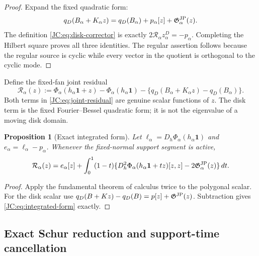 \documentclass[11pt]{amsart}
\providecommand{\mathscr}{\mathcal}
\numberwithin{equation}{section}
\newtheorem{proposition}[theorem]{Proposition}
\theoremstyle{definition}
\theoremstyle{remark}
\newcommand{\Gjp}{\mathfrak G^{\rm JP}}
\providecommand{\mathscr}[1]{\mathcal{#1}}
\begin{document}
\begin{proof}
Expand the fixed quadratic form:
\[
 q_D(B_\alpha+K_\alpha z)
 =q_D(B_\alpha)+p_\alpha[z]+\Gjp_\alpha(z).
\]
The definition \eqref{JC:eq:disk-corrector} is exactly
$2\mathcal R_\alpha z_\alpha^D=-p_\alpha$.  Completing the Hilbert square
proves all three identities.  The regular assertion follows because the
regular source is cyclic while every vector in the quotient is orthogonal
to the cyclic mode.
\end{proof}

Define the fixed-fan joint residual
\begin{equation}\label{JC:eq:joint-residual}
\boxed{
 \mathscr R_\alpha(z):=
 \Phi_\alpha(h_\alpha\mathbf1+z)
 -\Phi_\alpha(h_\alpha\mathbf1)
 -\{q_D(B_\alpha+K_\alpha z)-q_D(B_\alpha)\}.}
\end{equation}
Both terms in \eqref{JC:eq:joint-residual} are genuine scalar functions of
$z$.  The disk term is the fixed Fourier--Bessel quadratic form; it is not
the eigenvalue of a moving disk domain.

\begin{proposition}[Exact integrated form]\label{JC:prop:integrated-form}
Let $\ell_\alpha=D_h\Phi_\alpha(h_\alpha\mathbf1)$ and
$e_\alpha=\ell_\alpha-p_\alpha$.  Whenever the fixed-normal support
segment is active,
\begin{equation}\label{JC:eq:integrated-form}
 \mathscr R_\alpha(z)=e_\alpha[z]
 +\int_0^1(1-t)
 \{D_h^2\Phi_\alpha(h_\alpha\mathbf1+tz)[z,z]
       -2\Gjp_\alpha(z)\}\,dt.
\end{equation}
\end{proposition}

\begin{proof}
Apply the fundamental theorem of calculus twice to the polygonal scalar.
For the disk scalar use
$q_D(B+Kz)-q_D(B)=p[z]+\Gjp(z)$.  Subtraction gives
\eqref{JC:eq:integrated-form} exactly.
\end{proof}

\subsection{Exact Schur reduction and support-time cancellation}
\end{document}
